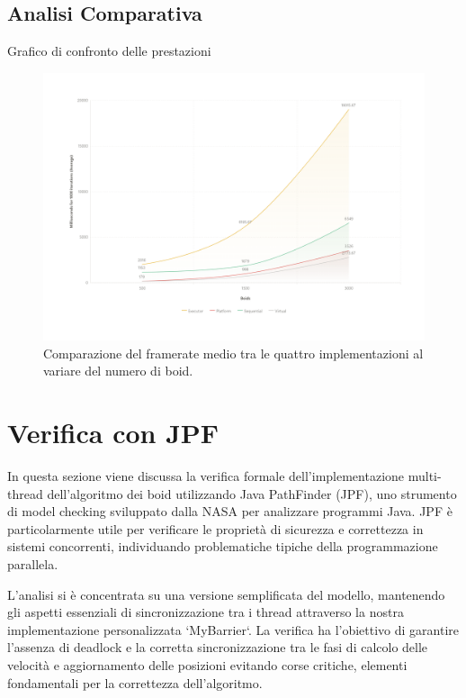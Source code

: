 \documentclass[a4paper,12pt]{report}
\begin{document}
\newpage

\section{Analisi Comparativa}
Grafico di confronto delle prestazioni
\begin{figure}[H]
    \centering
    \includegraphics[width=\textwidth]{img/performance_graph.png}
    \caption{Comparazione del framerate medio tra le quattro implementazioni al variare del numero di boid.}
    \label{fig:performance_comparison}
\end{figure}


\chapter{Verifica con JPF}
In questa sezione viene discussa la verifica formale dell'implementazione multi-thread dell'algoritmo dei boid utilizzando Java PathFinder (JPF), uno strumento di model checking sviluppato dalla NASA per analizzare programmi Java. 
JPF è particolarmente utile per verificare le proprietà di sicurezza e correttezza in sistemi concorrenti, individuando problematiche tipiche della programmazione parallela.

L'analisi si è concentrata su una versione semplificata del modello, mantenendo gli aspetti essenziali di sincronizzazione tra i thread attraverso la nostra implementazione personalizzata `MyBarrier`. La verifica ha l'obiettivo di garantire l'assenza di deadlock e la corretta sincronizzazione tra le fasi di calcolo delle velocità e aggiornamento delle posizioni evitando corse critiche, elementi fondamentali per la correttezza dell'algoritmo.
\end{document}
